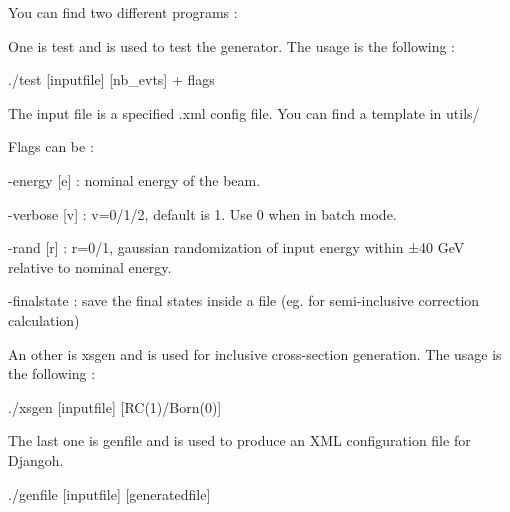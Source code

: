 You can find two different programs \+:
\begin{DoxyItemize}
\item One is {\ttfamily test} and is used to test the generator. The usage is the following \+:
\begin{DoxyItemize}
\item {\ttfamily ./test \mbox{[}inputfile\mbox{]} \mbox{[}nb\+\_\+evts\mbox{]} + flags}
\item The input file is a specified .xml config file. You can find a template in {\ttfamily utils/}
\item Flags can be \+:
\begin{DoxyItemize}
\item {\ttfamily -\/energy \mbox{[}e\mbox{]}} \+: nominal energy of the beam.
\item {\ttfamily -\/verbose \mbox{[}v\mbox{]}} \+: v=0/1/2, default is 1. Use 0 when in batch mode.
\item {\ttfamily -\/rand \mbox{[}r\mbox{]}} \+: r=0/1, gaussian randomization of input energy within ±40 GeV relative to nominal energy.
\item {\ttfamily -\/finalstate} \+: save the final states inside a file (eg. for semi-\/inclusive correction calculation)
\end{DoxyItemize}
\end{DoxyItemize}
\item An other is {\ttfamily xsgen} and is used for inclusive cross-\/section generation. The usage is the following \+:
\begin{DoxyItemize}
\item {\ttfamily ./xsgen \mbox{[}inputfile\mbox{]} \mbox{[}R\+C(1)/\+Born(0)\mbox{]}}
\end{DoxyItemize}
\item The last one is {\ttfamily genfile} and is used to produce an X\+ML configuration file for Djangoh.
\begin{DoxyItemize}
\item {\ttfamily ./genfile \mbox{[}inputfile\mbox{]} \mbox{[}generatedfile\mbox{]}} 
\end{DoxyItemize}
\end{DoxyItemize}